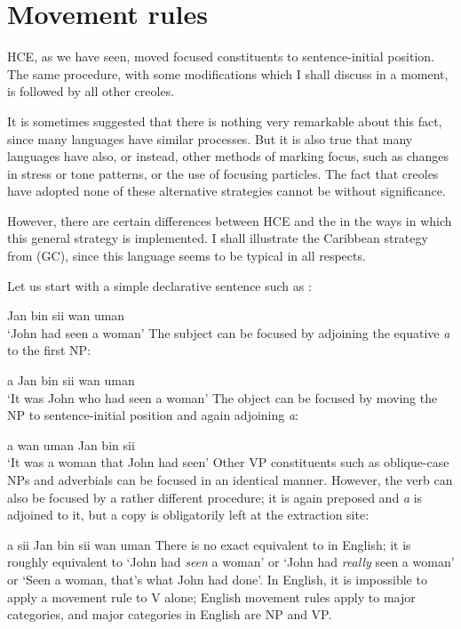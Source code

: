 \section{Movement rules}

HCE, as we have seen, moved focused constituents to sentence-initial position. The same procedure, with some modifications which I shall discuss in a moment, is followed by all other creoles.

It is sometimes suggested that there is nothing very remarkable about this fact, since many languages have similar processes. But it is also true that many languages have also, or instead, other methods of marking focus, such as changes in stress or tone patterns, or the use of focusing particles. The fact that creoles have adopted none of these alternative strategies cannot be without significance.


However, there are certain differences between HCE and the  in the ways in which this general strategy is imple\-mented. I shall illustrate the Caribbean strategy from  (GC), since this language seems to be typical in all respects.

Let us start with a simple declarative sentence such as :

\ea\label{ex:2:1}
 Jan bin sii wan uman \\
\glt `John had seen a woman'
\z %
The subject can be focused by adjoining the equative  \textit{a} to the first NP:

\ea\label{ex:2:2}
 a Jan bin sii wan uman\\
\glt `It was John who had seen a woman'
\z
The object can be focused by moving the NP to sentence-initial position and again adjoining \textit{a}:

\ea\label{ex:2:3}
 a wan uman Jan bin sii \\
\glt `It was a woman that John had seen'
\z
Other VP constituents such as oblique-case NPs and adverbials can be focused in an identical manner. However, the verb can also be focused by a rather different procedure; it is again preposed and \textit{a} is adjoined to it, but a copy is obligatorily left at the extraction site:

\ea\label{ex:2:4}
 a sii Jan bin sii wan uman
\z
There is no exact equivalent to  in English; it is roughly equivalent to `John had \textit{seen} a woman' or `John had \textit{really} seen a woman' or `Seen a woman, that's what John had done'. In English, it is impossible to apply a movement rule to V alone; English movement rules apply to major categories, and major categories in English are NP and VP.

